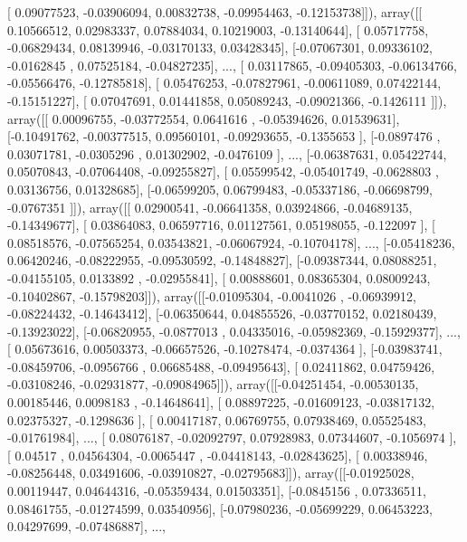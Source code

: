 \documentclass{article}
\begin{document}
       [ 0.09077523, -0.03906094,  0.00832738, -0.09954463, -0.12153738]]), array([[ 0.10566512,  0.02983337,  0.07884034,  0.10219003, -0.13140644],
       [ 0.05717758, -0.06829434,  0.08139946, -0.03170133,  0.03428345],
       [-0.07067301,  0.09336102, -0.0162845 ,  0.07525184, -0.04827235],
       ..., 
       [ 0.03117865, -0.09405303, -0.06134766, -0.05566476, -0.12785818],
       [ 0.05476253, -0.07827961, -0.00611089,  0.07422144, -0.15151227],
       [ 0.07047691,  0.01441858,  0.05089243, -0.09021366, -0.1426111 ]]), array([[ 0.00096755, -0.03772554,  0.0641616 , -0.05394626,  0.01539631],
       [-0.10491762, -0.00377515,  0.09560101, -0.09293655, -0.1355653 ],
       [-0.0897476 ,  0.03071781, -0.0305296 ,  0.01302902, -0.0476109 ],
       ..., 
       [-0.06387631,  0.05422744,  0.05070843, -0.07064408, -0.09255827],
       [ 0.05599542, -0.05401749, -0.0628803 ,  0.03136756,  0.01328685],
       [-0.06599205,  0.06799483, -0.05337186, -0.06698799, -0.0767351 ]]), array([[ 0.02900541, -0.06641358,  0.03924866, -0.04689135, -0.14349677],
       [ 0.03864083,  0.06597716,  0.01127561,  0.05198055, -0.122097  ],
       [ 0.08518576, -0.07565254,  0.03543821, -0.06067924, -0.10704178],
       ..., 
       [-0.05418236,  0.06420246, -0.08222955, -0.09530592, -0.14848827],
       [-0.09387344,  0.08088251, -0.04155105,  0.0133892 , -0.02955841],
       [ 0.00888601,  0.08365304,  0.08009243, -0.10402867, -0.15798203]]), array([[-0.01095304, -0.0041026 , -0.06939912, -0.08224432, -0.14643412],
       [-0.06350644,  0.04855526, -0.03770152,  0.02180439, -0.13923022],
       [-0.06820955, -0.0877013 ,  0.04335016, -0.05982369, -0.15929377],
       ..., 
       [ 0.05673616,  0.00503373, -0.06657526, -0.10278474, -0.0374364 ],
       [-0.03983741, -0.08459706, -0.0956766 ,  0.06685488, -0.09495643],
       [ 0.02411862,  0.04759426, -0.03108246, -0.02931877, -0.09084965]]), array([[-0.04251454, -0.00530135,  0.00185446,  0.0098183 , -0.14648641],
       [ 0.08897225, -0.01609123, -0.03817132,  0.02375327, -0.1298636 ],
       [ 0.00417187,  0.06769755,  0.07938469,  0.05525483, -0.01761984],
       ..., 
       [ 0.08076187, -0.02092797,  0.07928983,  0.07344607, -0.1056974 ],
       [ 0.04517   ,  0.04564304, -0.0065447 , -0.04418143, -0.02843625],
       [ 0.00338946, -0.08256448,  0.03491606, -0.03910827, -0.02795683]]), array([[-0.01925028,  0.00119447,  0.04644316, -0.05359434,  0.01503351],
       [-0.0845156 ,  0.07336511,  0.08461755, -0.01274599,  0.03540956],
       [-0.07980236, -0.05699229,  0.06453223,  0.04297699, -0.07486887],
       ..., 
\end{document}
